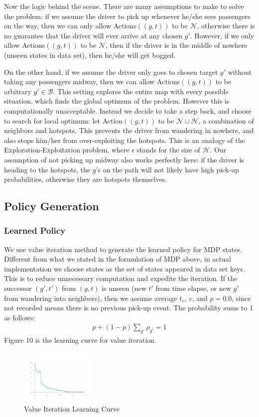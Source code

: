 \documentclass[letterpaper, 10 pt, conference]{ieeeconf}
\begin{document}
Now the logic behind the scene. There are many assumptions to make to solve the problem: if we assume the driver to pick up whenever he/she sees passengers on the way, then we can only allow Actions$((g,t))$ to be $\mathcal{N}$, otherwise there is no guarantee that the driver will ever arrive at any chosen $g'$. However, if we only allow Actions$((g,t))$ to be $\mathcal{N}$, then if the driver is in the middle of nowhere (unseen states in data set), then he/she will get bogged. 

On the other hand, if we assume the driver only goes to chosen target $g'$ without taking any passengers midway, then we can allow Actions$((g,t))$ to be arbitrary $g'\in\mathcal{B}$. This setting explores the entire map with every possible situation, which finds the global optimum of the problem. However this is computationally unacceptable. Instead we decide to take a step back, and choose to search for local optimum: let Action$((g,t))$ to be $\mathcal{N}\cup\mathcal{H}$, a combination of neighbors and hotspots. This prevents the driver from wandering in nowhere, and also stops him/her from over-exploiting the hotspots. This is an analogy of the Exploration-Exploitation problem, where $\epsilon$ stands for the size of $\mathcal{H}$. Our assumption of not picking up midway also works perfectly here: if the driver is heading to the hotspots, the $g$'s on the path will not likely have high pick-up probabilities, otherwise they are hotspots themselves.
\subsection{Policy Generation}
\subsubsection{Learned Policy}
We use value iteration method to generate the learned policy for MDP states. Different from what we stated in the formulation of MDP above, in actual implementation we choose states as the set of states appeared in data set keys. This is to reduce unnecessary computation and expedite the iteration. If the successor $(g',t')$ from $(g,t)$ is unseen (new $t'$ from time elapse, or new $g'$ from wandering into neighbors), then we assume average $t_c$, $v$, and $p=0.0$, since not recorded means there is no previous pick-up event. The probability sums to 1 as follows:
\begin{align}
p + (1-p)\sum_{g'}\rho_{g'} =1
\end{align}
Figure 10 is the learning curve for value iteration.
\begin{figure}
\centering
\includegraphics[width=0.33\textwidth]{tiny_VI_curve.png}
\caption{Value Iteration Learning Curve}
\end{figure}
\end{document}

